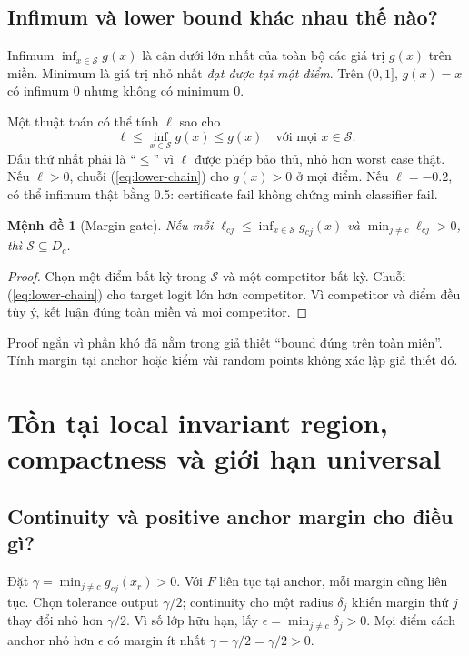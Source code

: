 \documentclass[11pt,a4paper]{article}
\newcommand{\Sset}{\mathcal S}
\newtheorem{proposition}{Mệnh đề}[section]
\theoremstyle{definition}
\begin{document}
\subsection{Infimum và lower bound khác nhau thế nào?}
Infimum $\inf_{x\in\Sset}g(x)$ là cận dưới lớn nhất của toàn bộ các giá trị
$g(x)$ trên miền. Minimum là giá trị nhỏ nhất \emph{đạt được tại một điểm}.
Trên $(0,1]$, $g(x)=x$ có infimum 0 nhưng không có minimum 0.

Một thuật toán có thể tính $\ell$ sao cho
\begin{equation}
\ell\le\inf_{x\in\Sset}g(x)\le g(x)\quad\text{với mọi }x\in\Sset.
\label{eq:lower-chain}
\end{equation}
Dấu thứ nhất phải là ``$\le$'' vì $\ell$ được phép bảo thủ, nhỏ hơn worst
case thật. Nếu $\ell>0$, chuỗi (\ref{eq:lower-chain}) cho $g(x)>0$ ở mọi
điểm. Nếu $\ell=-0.2$, có thể infimum thật bằng 0.5: certificate fail
không chứng minh classifier fail.

\begin{proposition}[Margin gate]
Nếu mỗi $\ell_{cj}\le\inf_{x\in\Sset}g_{cj}(x)$ và
$\min_{j\ne c}\ell_{cj}>0$, thì $\Sset\subseteq D_c$.
\end{proposition}
\begin{proof}
Chọn một điểm bất kỳ trong $\Sset$ và một competitor bất kỳ. Chuỗi
(\ref{eq:lower-chain}) cho target logit lớn hơn competitor. Vì competitor
và điểm đều tùy ý, kết luận đúng toàn miền và mọi competitor.
\end{proof}
Proof ngắn vì phần khó đã nằm trong giả thiết ``bound đúng trên toàn miền''.
Tính margin tại anchor hoặc kiểm vài random points không xác lập giả thiết đó.

\section{Tồn tại local invariant region, compactness và giới hạn universal}
\subsection{Continuity và positive anchor margin cho điều gì?}
Đặt $\gamma=\min_{j\ne c}g_{cj}(x_r)>0$. Với $F$ liên tục tại anchor, mỗi margin
cũng liên tục. Chọn tolerance output $\gamma/2$; continuity cho một radius
$\delta_j$ khiến margin thứ $j$ thay đổi nhỏ hơn $\gamma/2$. Vì số lớp hữu
hạn, lấy $\epsilon=\min_{j\ne c}\delta_j>0$. Mọi điểm cách anchor nhỏ hơn
$\epsilon$ có margin ít nhất $\gamma-\gamma/2=\gamma/2>0$.
\end{document}
